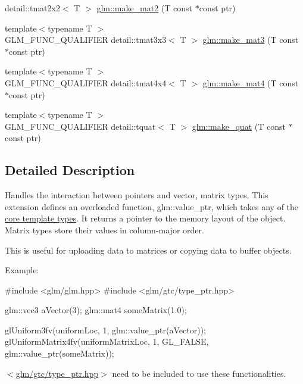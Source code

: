\begin{DoxyCompactItemize}
detail\-::tmat2x2$<$ \-T $>$ \hyperlink{group__gtc__type__ptr_ga1cd3c7e8207ad835a1f86c12b5f0e4ad}{glm\-::make\-\_\-mat2} (\-T const $\ast$const ptr)
\item 
{\footnotesize template$<$typename T $>$ }\\\-G\-L\-M\-\_\-\-F\-U\-N\-C\-\_\-\-Q\-U\-A\-L\-I\-F\-I\-E\-R \*
detail\-::tmat3x3$<$ \-T $>$ \hyperlink{group__gtc__type__ptr_gac6e0eaaceaf9652ccad60c429e6c827f}{glm\-::make\-\_\-mat3} (\-T const $\ast$const ptr)
\item 
{\footnotesize template$<$typename T $>$ }\\\-G\-L\-M\-\_\-\-F\-U\-N\-C\-\_\-\-Q\-U\-A\-L\-I\-F\-I\-E\-R \*
detail\-::tmat4x4$<$ \-T $>$ \hyperlink{group__gtc__type__ptr_ga35786a6758c046ef15fc4c03ae974861}{glm\-::make\-\_\-mat4} (\-T const $\ast$const ptr)
\item 
{\footnotesize template$<$typename T $>$ }\\\-G\-L\-M\-\_\-\-F\-U\-N\-C\-\_\-\-Q\-U\-A\-L\-I\-F\-I\-E\-R \*
detail\-::tquat$<$ \-T $>$ \hyperlink{group__gtc__type__ptr_ga74d6da8815bc118fdf18c78f739f59e9}{glm\-::make\-\_\-quat} (\-T const $\ast$const ptr)
\end{DoxyCompactItemize}


\subsection{\-Detailed \-Description}
\-Handles the interaction between pointers and vector, matrix types. \-This extension defines an overloaded function, glm\-::value\-\_\-ptr, which takes any of the \hyperlink{group__core__template}{core template types}. \-It returns a pointer to the memory layout of the object. \-Matrix types store their values in column-\/major order.

\-This is useful for uploading data to matrices or copying data to buffer objects.

\-Example\-: 
\begin{DoxyCode}
 #include <glm/glm.hpp>
 #include <glm/gtc/type_ptr.hpp>
 
 glm::vec3 aVector(3);
 glm::mat4 someMatrix(1.0);
 
 glUniform3fv(uniformLoc, 1, glm::value_ptr(aVector));
 glUniformMatrix4fv(uniformMatrixLoc, 1, GL_FALSE, glm::value_ptr(someMatrix));
\end{DoxyCode}


$<$\hyperlink{type__ptr_8hpp}{glm/gtc/type\-\_\-ptr.\-hpp}$>$ need to be included to use these functionalities. 

